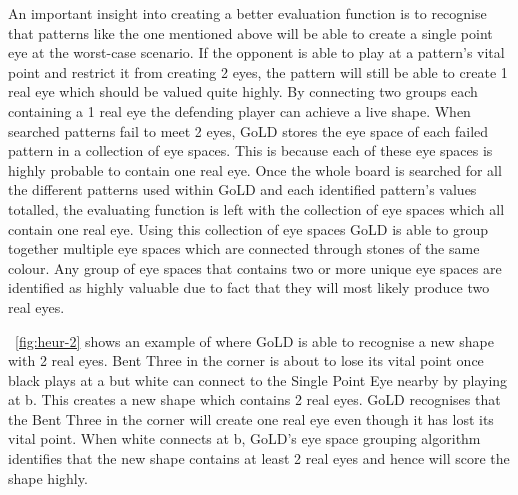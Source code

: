 \documentclass{l4proj}
\begin{document}
An important insight into creating a better evaluation function is to recognise that patterns like the one mentioned above will be able to create a single point eye at the worst-case scenario. If the opponent is able to play at a pattern's vital point and restrict it from creating 2 eyes, the pattern will still be able to create 1 real eye which should be valued quite highly. By connecting two groups each containing a 1 real eye the defending player can achieve a live shape. When searched patterns fail to meet 2 eyes, GoLD stores the eye space of each failed pattern in a collection of eye spaces. This is because each of these eye spaces is highly probable to contain one real eye. Once the whole board is searched for all the different patterns used within GoLD and each identified pattern's values totalled, the evaluating function is left with the collection of eye spaces which all contain one real eye. Using this collection of eye spaces GoLD is able to group together multiple eye spaces which are connected through stones of the same colour. Any group of eye spaces that contains two or more unique eye spaces are identified as highly valuable due to fact that they will most likely produce two real eyes.

~\autoref{fig:heur-2} shows an example of where GoLD is able to recognise a new shape with 2 real eyes. Bent Three in the corner is about to lose its vital point once black plays at a but white can connect to the Single Point Eye nearby by playing at b. This creates a new shape which contains 2 real eyes. GoLD recognises that the Bent Three in the corner will create one real eye even though it has lost its vital point. When white connects at b, GoLD's eye space grouping algorithm identifies that the new shape contains at least 2 real eyes and hence will score the shape highly.
\end{document}
